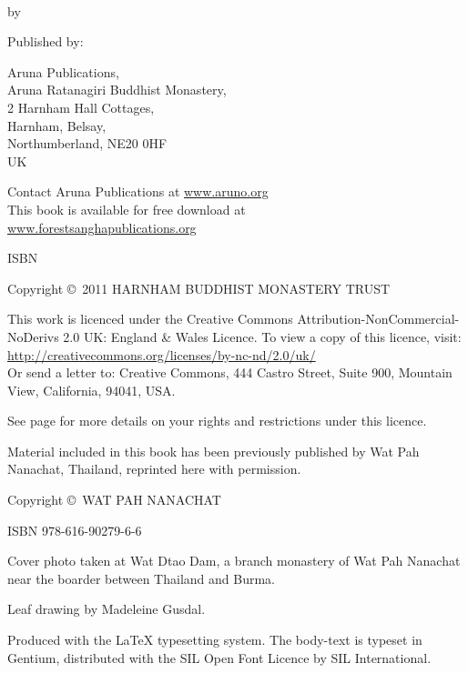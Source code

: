 {\smaller\setlength{\parskip}{0.8em}\setlength{\parindent}{0em}%
{\raggedright%

\bookTitle \\
by \bookAuthor

Published by:

Aruna Publications,\\
Aruna Ratanagiri Buddhist Monastery,\\
2 Harnham Hall Cottages,\\
Harnham, Belsay,\\
Northumberland, NE20 0HF\\
UK

Contact Aruna Publications at \href{http://aruno.org}{www.aruno.org}\\
This book is available for free download at\\
\href{http://forestsanghapublications.org/}{www.forestsanghapublications.org}

ISBN \bookISBN

Copyright \copyright\ 2011 HARNHAM BUDDHIST MONASTERY TRUST

\vfill

{\tiny

This work is licenced under the Creative Commons Attribution-NonCommercial-NoDerivs 2.0 UK: England \& Wales Licence. To view a copy of this licence, visit:\\
\href{http://creativecommons.org/licenses/by-nc-nd/2.0/uk/}{http://creativecommons.org/licenses/by-nc-nd/2.0/uk/}\\
Or send a letter to: Creative Commons, 444 Castro Street, Suite 900, Mountain View, California, 94041, USA.

See page \pageref{cc-details} for more details on your rights and restrictions under this licence.

Material included in this book has been previously published by Wat Pah Nanachat, Thailand, reprinted here with permission.

Copyright \copyright\ WAT PAH NANACHAT

ISBN 978-616-90279-6-6

Cover photo taken at Wat Dtao Dam, a branch monastery of Wat Pah Nanachat near the boarder between Thailand and Burma.

Leaf drawing by Madeleine Gusdal.

Produced with the {\selectfont\LaTeX} typesetting system. The body-text is typeset in Gentium, distributed with the SIL Open Font Licence by SIL International.

\editioninfo

}

}}

